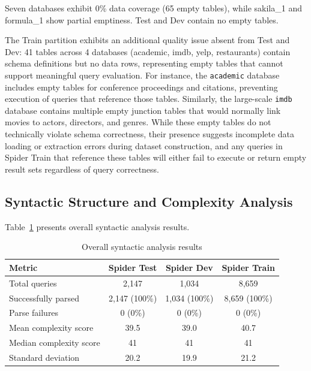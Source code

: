 \documentclass[print]{einformatica}
\begin{document}
Seven databases exhibit 0\% data coverage (65 empty tables), while sakila\_1 and formula\_1 show partial emptiness. Test and Dev contain no empty tables.

The Train partition exhibits an additional quality issue absent from Test and Dev: 41 tables across 4 databases (academic, imdb, yelp, restaurants) contain schema definitions but no data rows, representing empty tables that cannot support meaningful query evaluation. For instance, the \texttt{academic} database includes empty tables for conference proceedings and citations, preventing execution of queries that reference those tables. Similarly, the large-scale \texttt{imdb} database contains multiple empty junction tables that would normally link movies to actors, directors, and genres. While these empty tables do not technically violate schema correctness, their presence suggests incomplete data loading or extraction errors during dataset construction, and any queries in Spider Train that reference these tables will either fail to execute or return empty result sets regardless of query correctness.

\subsection{Syntactic Structure and Complexity Analysis}\label{sec:syntax_results}

Table~\ref{tab:syntax_overall} presents overall syntactic analysis results.

\begin{table}[ht]
    \caption{Overall syntactic analysis results}
    \label{tab:syntax_overall}
    \centering
    \footnotesize
    \begin{tabular}{lccc}
        \toprule
        \textbf{Metric} & \textbf{Spider Test} & \textbf{Spider Dev} & \textbf{Spider Train} \\
        \midrule
        Total queries & 2,147 & 1,034 & 8,659 \\
        Successfully parsed & 2,147 (100\%) & 1,034 (100\%) & 8,659 (100\%) \\
        Parse failures & 0 (0\%) & 0 (0\%) & 0 (0\%) \\
        Mean complexity score & 39.5 & 39.0 & 40.7 \\
        Median complexity score & 41 & 41 & 41 \\
        Standard deviation & 20.2 & 19.9 & 21.2 \\
        \bottomrule
    \end{tabular}
\end{table}
\end{document}
